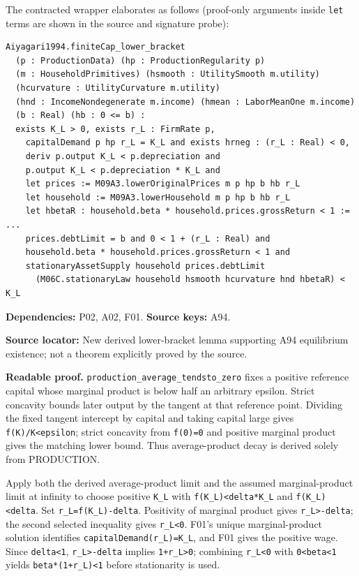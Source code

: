 \documentclass[
  11pt,
]{article}
\let\LedgerOriginalTexttt\texttt
\renewcommand{\texttt}[1]{{\small\LedgerOriginalTexttt{#1}}}
\begin{document}
The contracted wrapper elaborates as follows (proof-only arguments
inside \texttt{let} terms are shown in the source and signature probe):

\begin{verbatim}
Aiyagari1994.finiteCap_lower_bracket
  (p : ProductionData) (hp : ProductionRegularity p)
  (m : HouseholdPrimitives) (hsmooth : UtilitySmooth m.utility)
  (hcurvature : UtilityCurvature m.utility)
  (hnd : IncomeNondegenerate m.income) (hmean : LaborMeanOne m.income)
  (b : Real) (hb : 0 <= b) :
  exists K_L > 0, exists r_L : FirmRate p,
    capitalDemand p hp r_L = K_L and exists hrneg : (r_L : Real) < 0,
    deriv p.output K_L < p.depreciation and
    p.output K_L < p.depreciation * K_L and
    let prices := M09A3.lowerOriginalPrices m p hp b hb r_L
    let household := M09A3.lowerHousehold m p hp b hb r_L
    let hbetaR : household.beta * household.prices.grossReturn < 1 := ...
    prices.debtLimit = b and 0 < 1 + (r_L : Real) and
    household.beta * household.prices.grossReturn < 1 and
    stationaryAssetSupply household prices.debtLimit
      (M06C.stationaryLaw household hsmooth hcurvature hnd hbetaR) < K_L
\end{verbatim}

\textbf{Dependencies:} P02, A02, F01. \textbf{Source keys:} A94.

\textbf{Source locator:} New derived lower-bracket lemma supporting A94
equilibrium existence; not a theorem explicitly proved by the source.

\textbf{Readable proof.} \texttt{production\_average\_tendsto\_zero}
fixes a positive reference capital whose marginal product is below half
an arbitrary epsilon. Strict concavity bounds later output by the
tangent at that reference point. Dividing the fixed tangent intercept by
capital and taking capital large gives
\texttt{f(K)/K\textless{}epsilon}; strict concavity from \texttt{f(0)=0}
and positive marginal product gives the matching lower bound. Thus
average-product decay is derived solely from PRODUCTION.

Apply both the derived average-product limit and the assumed
marginal-product limit at infinity to choose positive \texttt{K\_L} with
\texttt{f(K\_L)\textless{}delta*K\_L} and
\texttt{f\textquotesingle{}(K\_L)\textless{}delta}. Set
\texttt{r\_L=f\textquotesingle{}(K\_L)-delta}. Positivity of marginal
product gives \texttt{r\_L\textgreater{}-delta}; the second selected
inequality gives \texttt{r\_L\textless{}0}. F01's unique
marginal-product solution identifies \texttt{capitalDemand(r\_L)=K\_L},
and F01 gives the positive wage. Since \texttt{delta\textless{}1},
\texttt{r\_L\textgreater{}-delta} implies
\texttt{1+r\_L\textgreater{}0}; combining \texttt{r\_L\textless{}0} with
\texttt{0\textless{}beta\textless{}1} yields
\texttt{beta*(1+r\_L)\textless{}1} before stationarity is used.
\end{document}
